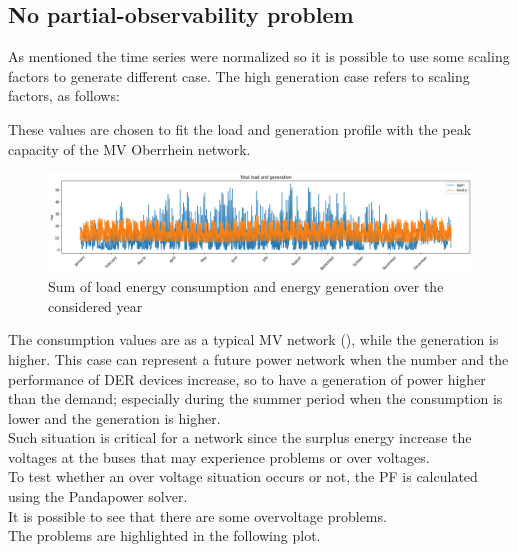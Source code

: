 \subsection{No partial-observability problem}
As mentioned the time series were normalized so it is possible to use some scaling factors to generate different case. The high generation case refers to scaling factors, as follows:
\begin{algorithm}[H]
    
\end{algorithm}

These values are chosen to fit the load and generation profile with the peak capacity of the MV Oberrhein network.

\begin{figure}[H]
\centering
    \includegraphics[width=.9\linewidth]{images/MVOberr/Load&Gens.png}
\caption{Sum of load energy consumption and energy generation over the considered year}
\label{fig:gym_anm_net}
\end{figure}

The consumption values are as a typical MV network (\cite{MVnetworks}), while the generation is higher. This case can represent a future power network when the number and the performance of \gls{DER} devices increase, so to have a generation of power higher than the demand; especially during the summer period when the consumption is lower and the generation is higher.\\
Such situation is critical for a network since the surplus energy increase the voltages at the buses that may experience problems or over voltages. \\


To test whether an over voltage situation occurs or not, the \gls{PF} is calculated using the Pandapower solver.\\
It is possible to see that there are some overvoltage problems. \\
The problems are highlighted in the following plot.

